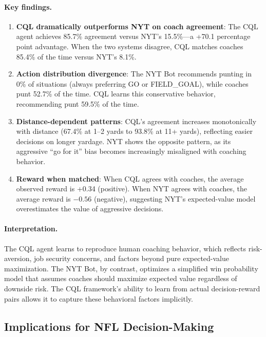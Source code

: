 \paragraph{Key findings.}
\begin{enumerate}
    \item \textbf{CQL dramatically outperforms NYT on coach agreement}: The CQL agent achieves 85.7\% agreement versus NYT's 15.5\%---a +70.1 percentage point advantage. When the two systems disagree, CQL matches coaches 85.4\% of the time versus NYT's 8.1\%.

    \item \textbf{Action distribution divergence}: The NYT Bot recommends punting in 0\% of situations (always preferring GO or FIELD\_GOAL), while coaches punt 52.7\% of the time. CQL learns this conservative behavior, recommending punt 59.5\% of the time.

    \item \textbf{Distance-dependent patterns}: CQL's agreement increases monotonically with distance (67.4\% at 1--2 yards to 93.8\% at 11+ yards), reflecting easier decisions on longer yardage. NYT shows the opposite pattern, as its aggressive ``go for it'' bias becomes increasingly misaligned with coaching behavior.

    \item \textbf{Reward when matched}: When CQL agrees with coaches, the average observed reward is +0.34 (positive). When NYT agrees with coaches, the average reward is $-0.56$ (negative), suggesting NYT's expected-value model overestimates the value of aggressive decisions.
\end{enumerate}

\paragraph{Interpretation.}
The CQL agent learns to reproduce human coaching behavior, which reflects risk-aversion, job security concerns, and factors beyond pure expected-value maximization. The NYT Bot, by contrast, optimizes a simplified win probability model that assumes coaches should maximize expected value regardless of downside risk. The CQL framework's ability to learn from actual decision-reward pairs allows it to capture these behavioral factors implicitly.

\subsection{Implications for NFL Decision-Making}

